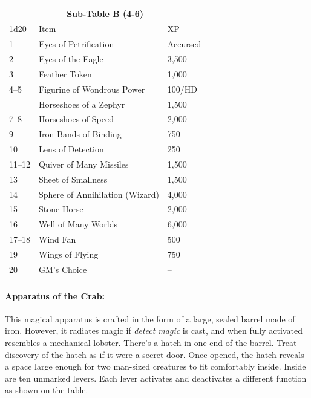 \begin{multicols}{2}
\begin{minipage}{\columnwidth}
\end{minipage}

\noindent \begin{tabular}{|p{}|p{}|p{}|}\multicolumn{3}{c}{Sub-Table B (4-6)} \\
\hline
1d20	& Item	& XP \\
\hline\hline
\rowcolor[gray]{0.9}1	& Eyes of Petrification	& Accursed \\
2	& Eyes of the Eagle	& 3,500 \\
\rowcolor[gray]{0.9}3	& Feather Token	& 1,000 \\
4--5	& Figurine of Wondrous Power	& 100/HD \\
\rowcolor[gray]{0.9}	& Horseshoes of a Zephyr	& 1,500 \\
7--8	& Horseshoes of Speed	& 2,000 \\
\rowcolor[gray]{0.9}9	& Iron Bands of Binding	& 750 \\
10	& Lens of Detection	& 250 \\
\rowcolor[gray]{0.9}11--12	& Quiver of Many Missiles	& 1,500 \\
13	& Sheet of Smallness	& 1,500 \\
\rowcolor[gray]{0.9}14	& Sphere of Annihilation (Wizard)	& 4,000 \\
15	& Stone Horse	& 2,000 \\
\rowcolor[gray]{0.9}16	& Well of Many Worlds	& 6,000 \\
17--18	& Wind Fan	& 500 \\
\rowcolor[gray]{0.9}19	& Wings of Flying	& 750 \\
20	& GM's Choice	& -- \\
\hline
\end{tabular}

\paragraph{Apparatus of the Crab:} This magical apparatus is crafted in the form of a large, sealed barrel made of iron.  However, it radiates magic if \textit{detect magic} is cast, and when fully activated resembles a mechanical lobster.  There's a hatch in one end of the barrel.  Treat discovery of the hatch as if it were a secret door.  Once opened, the hatch reveals a space large enough for two man-sized creatures to fit comfortably inside. Inside are ten unmarked levers.  Each lever activates and deactivates a different function as shown on the table.    


\end{multicols}
